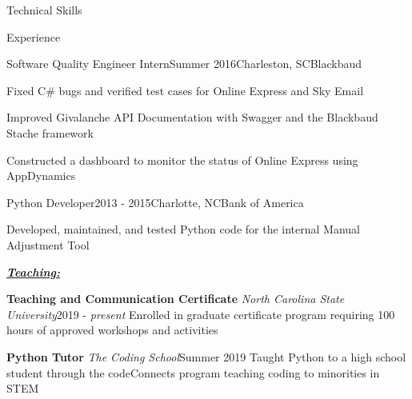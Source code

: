 \documentclass{resume} %
\begin{document}
\begin{rSection}{Technical Skills}
\begin{rSection}{Experience}
\begin{pSubsection}{\small Software Quality Engineer Intern}{\small Summer 2016}{\small Charleston, SC}{\small Blackbaud}
    \item {\small Fixed C\# bugs and verified test cases for Online Express and Sky Email}
    \item {\small Improved Givalanche API Documentation with Swagger and the Blackbaud Stache framework}
    \item {\small Constructed a dashboard to monitor the status of Online Express using AppDynamics}
\end{pSubsection}
\vspace{-10pt}

\begin{pSubsection}{\small Python Developer}{\small 2013 - 2015}{\small Charlotte, NC}{\small Bank of America}
\item {\small Developed, maintained, and tested Python code for the internal Manual Adjustment Tool}
\end{pSubsection}
\vspace{-8pt}

\underline{\textbf{\textit{Teaching:}}}
\vspace{-7pt}

\begin{eSubsection}{\small \textbf{Teaching and Communication Certificate} \textit{North Carolina State University}}{\small 2019 - \textit{present}}
{\small Enrolled in graduate certificate program requiring 100 hours of approved workshops and activities}
\end{eSubsection}
\vspace{-8pt}

\begin{eSubsection}{\small \textbf{Python Tutor} \textit{The Coding School}}{\small Summer 2019}
{\small Taught Python to a high school student through the codeConnects program teaching coding to minorities in STEM}
\end{eSubsection}
\vspace{-8pt}


\end{rSection}
\end{rSection}
\end{document}
